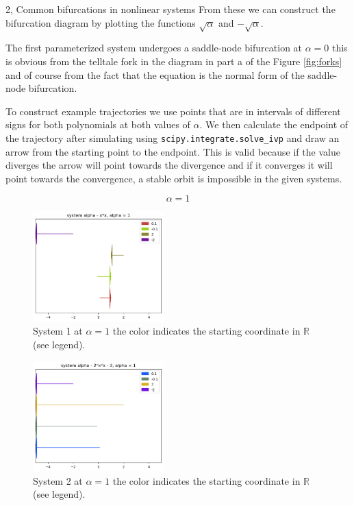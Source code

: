 \begin{task}{2, Common bifurcations in nonlinear systems}
From these we can construct the bifurcation diagram by plotting the functions $\sqrt{\alpha}$ and $-\sqrt{\alpha}$.

The first parameterized system undergoes a saddle-node bifurcation at $\alpha = 0$ this is obvious from the telltale fork in the diagram in part a of the Figure \ref{fig:forks} and of course from the fact that the equation is the normal form of the saddle-node bifurcation.

To construct example trajectories we use points that are in intervals of different signs for both polynomials at both values of $\alpha$. We then calculate the endpoint of the trajectory after simulating using \verb|scipy.integrate.solve_ivp| and draw an arrow from the starting point to the endpoint. This is valid because if the value diverges the arrow will point towards the divergence and if it converges it will point towards the convergence, a stable orbit is impossible in the given systems.

$$\alpha = 1$$

\begin{figure}[H]
    \centering
    \includegraphics[width=0.45\textwidth]{images/1+1.png}
    \caption{System 1 at $\alpha = 1$ the color indicates the starting coordinate in $\mathbb{R}$ (see legend).}
    \label{fig:1+1}
\end{figure}

\begin{figure}[H]
    \centering
    \includegraphics[width=0.45\textwidth]{images/2+1.png}
    \caption{System 2 at $\alpha = 1$ the color indicates the starting coordinate in $\mathbb{R}$ (see legend).}
    \label{fig:2+1}
\end{figure}


\end{task}
